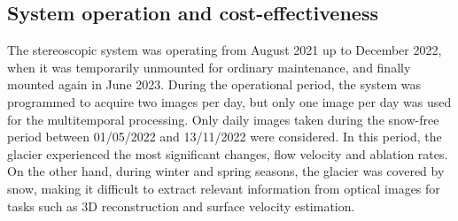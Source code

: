 

\subsection{System operation and cost-effectiveness}

The stereoscopic system was operating from August 2021 up to December 2022, when it was
temporarily unmounted for ordinary maintenance, and finally mounted again in June 2023.
During the operational period, the system was programmed to acquire two images per day,
but only one image per day was used for the multitemporal processing.
Only daily images taken during the snow-free period between 01/05/2022 and
13/11/2022 were considered.
In this period, the glacier experienced the most significant changes, flow velocity
and ablation rates. On the other hand, during winter and spring seasons, the glacier was
covered by snow, making it difficult to extract relevant information from optical images
for tasks such as 3D reconstruction and surface velocity estimation.

